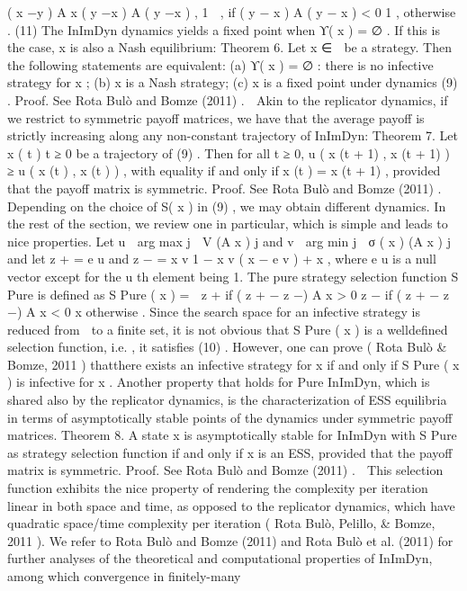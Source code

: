 \documentclass[a4paper]{article}
\begin{document}
( x −y ) 	 A x
( y −x ) 	 A ( y −x ) , 1

, if ( y − x ) 	 A ( y − x ) < 0
1 , otherwise .
(11)
The InImDyn dynamics yields a fixed point when ϒ( x ) = ∅ . If
this is the case, x is also a Nash equilibrium:
Theorem 6. Let x ∈  be a strategy. Then the following statements
are equivalent:
(a) ϒ( x ) = ∅ : there is no infective strategy for x ;
(b) x is a Nash strategy;
(c) x is a fixed point under dynamics (9) .
Proof. See Rota Bulò and Bomze (2011) . 
Akin to the replicator dynamics, if we restrict to symmetric
payoff matrices, we have that the average payoff is strictly
increasing along any non-constant trajectory of InImDyn:
Theorem 7. Let { x ( t )} t ≥ 0 be a trajectory of (9) . Then for all t ≥ 0,
u ( x (t + 1) , x (t + 1) ) ≥ u ( x (t ) , x (t ) ) ,
with equality if and only if x (t ) = x (t + 1) , provided that the payoff
matrix is symmetric.
Proof. See Rota Bulò and Bomze (2011) . 
Depending on the choice of S( x ) in (9) , we may obtain
different dynamics. In the rest of the section, we review one
in particular, which is simple and leads to nice properties. Let
u ∈ arg max j ∈ V (A x ) j and v ∈ arg min j ∈ σ ( x ) (A x ) j and let
z
+ = e u and z
− =
x v
1 − x v
( x − e v ) + x ,
where e u is a null vector except for the u th element being 1. The
pure strategy selection function S Pure is defined as
S Pure ( x ) =

z + if ( z + − z −) 	 A x > 0
z − if ( z + − z −) 	 A x < 0
x otherwise .
Since the search space for an infective strategy is reduced from
 to a finite set, it is not obvious that S Pure ( x ) is a welldefined
selection function, i.e. , it satisfies (10) . However, one can
prove ( Rota Bulò & Bomze, 2011 ) thatthere exists an infective
strategy for x if and only if S Pure ( x ) is infective for x .
Another property that holds for Pure InImDyn, which is shared
also by the replicator dynamics, is the characterization of ESS
equilibria in terms of asymptotically stable points of the dynamics
under symmetric payoff matrices.
Theorem 8. A state x is asymptotically stable for InImDyn with S Pure
as strategy selection function if and only if x is an ESS, provided that
the payoff matrix is symmetric.
Proof. See Rota Bulò and Bomze (2011) . 
This selection function exhibits the nice property of rendering
the complexity per iteration linear in both space and time,
as opposed to the replicator dynamics, which have quadratic
space/time complexity per iteration ( Rota Bulò, Pelillo, & Bomze,
2011 ). We refer to Rota Bulò and Bomze (2011) and Rota Bulò et al.
(2011) for further analyses of the theoretical and computational
properties of InImDyn, among which convergence in finitely-many
\end{document}
